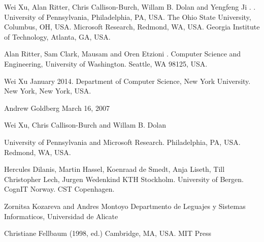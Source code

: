 \documentclass[11pt,letterpaper]{article}
\begin{document}
\begin{thebibliography}{}

Wei Xu, Alan Ritter, Chris Callison-Burch, Willam B. Dolan and Yengfeng Ji
.
.
\newblock University of Pennsylvania, Philadelphia, PA, USA.
\newblock The Ohio State University, Columbus, OH, USA.
\newblock Microsoft Research, Redmond, WA, USA.
\newblock Georgia Institute of Technology, Atlanta, GA, USA.

Alan Ritter, Sam Clark, Mausam and Oren Etzioni
.
\newblock Computer Science and Engineering, University of Washington.
\newblock Seattle, WA 98125, USA.

Wei Xu
\newblock January 2014.
\newblock Department of Computer Science, New York University.
\newblock New York, New York, USA.

Andrew Goldberg
\newblock March 16, 2007

Wei Xu, Chris Callison-Burch and Willam B. Dolan

\newblock University of Pennsylvania and Microsoft Research.
\newblock Philadelphia, PA, USA.
\newblock Redmond, WA, USA.

Hercules Dilanis, Martin Hassel, Koenraad de Smedt, Anja Liseth, Till Christopher Lech, Jurgen Wedenkind
\newblock KTH Stockholm.
\newblock University of Bergen.
\newblock CognIT Norway.
\newblock CST Copenhagen.

Zornitsa Kozareva and Andres Montoyo
\newblock Departmento de Leguajes y Sistemas Informaticos, Universidad de Alicate

Christiane Fellbaum
\newblock (1998, ed.)
\newblock Cambridge, MA, USA.
\newblock MIT Press

\end{thebibliography}
\end{document}
